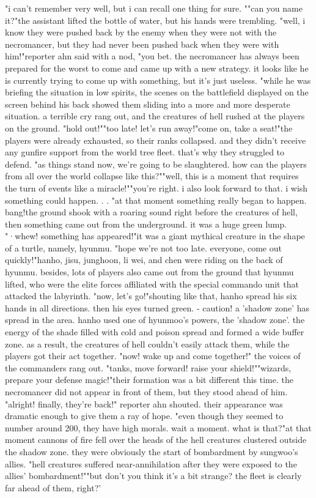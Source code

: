 "i can't remember very well, but i can recall one thing for sure.
""can you name it?"the assistant lifted the bottle of water, but his hands were trembling.
"well, i know they were pushed back by the enemy when they were not with the necromancer, but they had never been pushed back when they were with him!"reporter ahn said with a nod, "you bet.
 the necromancer has always been prepared for the worst to come and came up with a new strategy.
 it looks like he is currently trying to come up with something, but it's just useless.
"while he was briefing the situation in low spirits, the scenes on the battlefield displayed on the screen behind his back showed them sliding into a more and more desperate situation.
a terrible cry rang out, and the creatures of hell rushed at the players on the ground.
"hold out!""too late! let's run away!"come on, take a seat!"the players were already exhausted, so their ranks collapsed.
 and they didn't receive any gunfire support from the world tree fleet.
 that's why they struggled to defend.
"as things stand now, we're going to be slaughtered.
 how can the players from all over the world collapse like this?""well, this is a moment that requires the turn of events like a miracle!""you're right.
 i also look forward to that.
 i wish something could happen.
.
.
"at that moment something really began to happen.
bang!the ground shook with a roaring sound right before the creatures of hell, then something came out from the underground.
 it was a huge green lump.
"·whew! something has appeared!"it was a giant mythical creature in the shape of a turtle, namely, hyunmu.
"hope we're not too late.
 everyone, come out quickly!"hanho, jisu, junghoon, li wei, and chen were riding on the back of hyunmu.
besides, lots of players also came out from the ground that hyunmu lifted, who were the elite forces affiliated with the special commando unit that attacked the labyrinth.
"now, let's go!"shouting like that, hanho spread his six hands in all directions.
 then his eyes turned green.
- caution! a 'shadow zone' has spread in the area.
hanho used one of hyunmoo's powers, the 'shadow zone'.
 the energy of the shade filled with cold and poison spread and formed a wide buffer zone.
 as a result, the creatures of hell couldn't easily attack them, while the players got their act together.
"now! wake up and come together!" the voices of the commanders rang out.
"tanks, move forward! raise your shield!""wizards, prepare your defense magic!"their formation was a bit different this time.
 the necromancer did not appear in front of them, but they stood ahead of him.
"alright! finally, they're back!" reporter ahn shouted.
 their appearance was dramatic enough to give them a ray of hope.
"even though they seemed to number around 200, they have high morals.
 wait a moment.
 what is that?"at that moment cannons of fire fell over the heads of the hell creatures clustered outside the shadow zone.
 they were obviously the start of bombardment by sungwoo's allies.
 "hell creatures suffered near-annihilation after they were exposed to the allies' bombardment!""but don't you think it's a bit strange? the fleet is clearly far ahead of them, right?'

